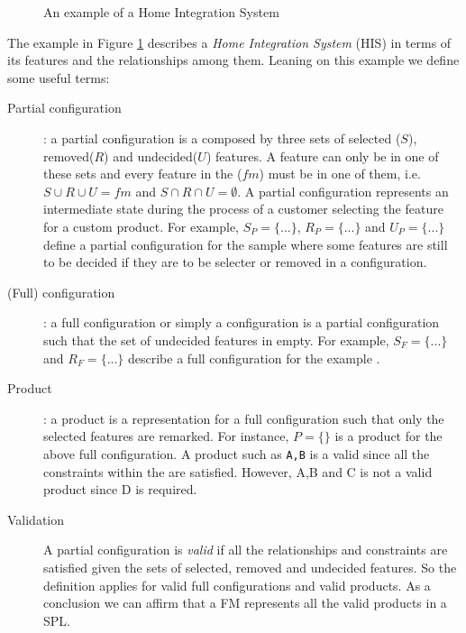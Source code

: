 \begin{figure}[htb]
	\centering
		\caption{An example of a Home Integration System\label{fig:FMexample}}
\end{figure}

The example in Figure \ref{fig:FMexample} describes a \emph{Home Integration System} (HIS) \spl in terms of its features and the relationships among them. Leaning on this example we define some useful terms:

\begin{description}
\item[Partial configuration] : a partial configuration is a composed by three sets of selected ($S$), removed($R$) and undecided($U$) features.  A feature can only be in one of these sets and every feature in the \fm ($fm$) must be in one of them, i.e. $S \cup R \cup U = fm$ and $S \cap R \cap U = \emptyset$. A partial configuration represents an intermediate state during the process of a customer selecting the feature for a custom product. For example, $S_P=\{...\}$, $R_P=\{...\}$ and $U_P=\{...\}$ define a partial configuration for the sample \fm where some features are still to be decided if they are to be selecter or removed in a configuration.
\end{description}

\begin{description}
\item[(Full) configuration] : a full configuration or simply a configuration is a partial configuration such that the set of undecided features in empty. For example, $S_F=\{...\}$ and $R_F=\{...\}$ describe a full configuration for the example \fm.
\end{description}

\begin{description}
\item[Product] : a product is a representation for a full configuration such that only the selected features are remarked. For instance, $P=\{\}$ is a product for the above full configuration. A product such as \texttt{A,B} is a valid since all the constraints within the \fm are satisfied. However, A,B and C is not a valid product since D is required.
\end{description}

\begin{description}
\item[Validation]
A partial configuration is \emph{valid} if all the relationships and constraints are satisfied given the sets of selected, removed and undecided features. So the definition applies for valid full configurations and valid products. As a conclusion we can affirm that a FM represents all the valid products in a SPL.
\end{description}

